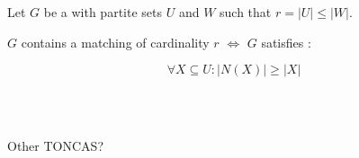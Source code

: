 
\begin{frame}{}
  \begin{theorem}
    Let $G$ be a  with partite sets $U$ and $W$ such that $r = |U| \le |W|$.

    $G$ contains a matching of cardinality $r$ $\iff$ $G$ satisfies :

    \[
      \forall X \subseteq U: \big\lvert N(X) \big\rvert \ge \big\lvert X \big\rvert
    \]
  \end{theorem}

  \pause
  \begin{center}
     \\[5pt]
     \\[8pt]
  \end{center}

  \pause
  \vspace{-0.30cm} 
  \vspace{-0.30cm} 
  \centerline{\footnotesize Other TONCAS?}
\end{frame}

\begin{frame}{}
  \begin{exampleblock}{}
  \end{exampleblock}
\end{frame}

\begin{frame}{}
  \begin{exampleblock}{}
  \end{exampleblock}
\end{frame}

\begin{frame}{}
  \begin{exampleblock}{}
  \end{exampleblock}
\end{frame}

\begin{frame}{}
  \begin{exampleblock}{}
  \end{exampleblock}
\end{frame}

\begin{frame}{}
\end{frame}
